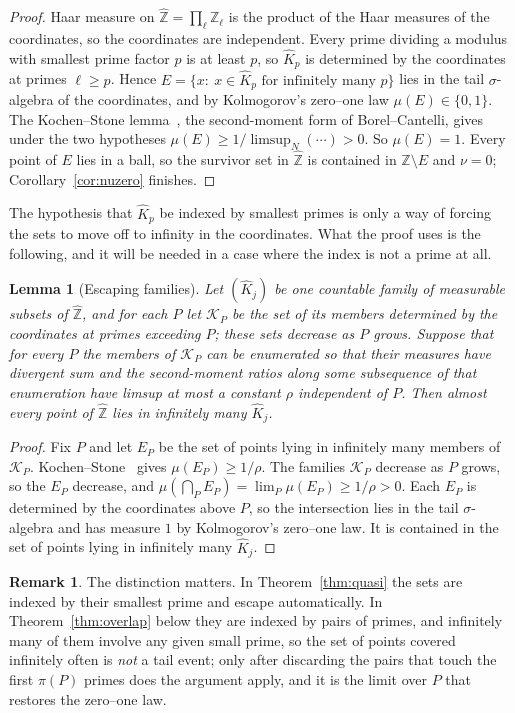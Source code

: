 \documentclass[11pt]{article}
\theoremstyle{plain}
\newtheorem{lemma}[theorem]{Lemma}
\theoremstyle{definition}
\newtheorem{remark}[theorem]{Remark}
\newcommand{\Zhat}{\widehat{\mathbb{Z}}}
\newcommand{\Kh}{\widehat{K}}
\begin{document}
\begin{proof}
Haar measure on $\Zhat=\prod_\ell\mathbb{Z}_\ell$ is the product
of the Haar measures of the coordinates, so the coordinates are
independent.  Every prime dividing a modulus with smallest prime
factor $p$ is at least $p$, so $\Kh_p$ is determined by the
coordinates at primes $\ell\ge p$.  Hence
$E=\{x:\ x\in \Kh_p\text{ for infinitely many }p\}$ lies in the
tail $\sigma$-algebra of the coordinates, and by Kolmogorov's
zero--one law $\mu(E)\in\{0,1\}$.  The Kochen--Stone
lemma~\cite{KS}, the second-moment form of Borel--Cantelli,
gives under the two hypotheses
$\mu(E)\ge1/\limsup_N(\cdots)>0$.  So $\mu(E)=1$.  Every point
of $E$ lies in a ball, so the survivor set in $\Zhat$ is
contained in $\Zhat\setminus E$ and $\nu=0$;
Corollary~\ref{cor:nuzero} finishes.
\end{proof}

The hypothesis that $\Kh_p$ be indexed by smallest primes is
only a way of forcing the sets to move off to infinity in the
coordinates.  What the proof uses is the following, and it will
be needed in a case where the index is not a prime at all.

\begin{lemma}[Escaping families]\label{lem:escape}
Let $(\Kh_j)$ be one countable family of measurable subsets of
$\Zhat$, and for each $P$ let $\mathcal{K}_P$ be the set of its
members determined by the coordinates at primes exceeding $P$;
these sets decrease as $P$ grows.  Suppose
that for every $P$ the members of $\mathcal{K}_P$ can be
enumerated so that their measures have divergent sum and the
second-moment ratios along some subsequence of that
enumeration have limsup at most a constant $\rho$ independent of
$P$.  Then almost every point of $\Zhat$
lies in infinitely many $\Kh_j$.
\end{lemma}

\begin{proof}
Fix $P$ and let $E_P$ be the set of points lying in infinitely
many members of $\mathcal{K}_P$.  Kochen--Stone~\cite{KS} gives
$\mu(E_P)\ge1/\rho$.  The families $\mathcal{K}_P$ decrease as
$P$ grows, so the $E_P$ decrease, and $\mu(\bigcap_PE_P)
=\lim_P\mu(E_P)\ge1/\rho>0$.  Each $E_P$ is determined by the
coordinates above $P$, so the intersection lies in the tail
$\sigma$-algebra and has measure $1$ by Kolmogorov's zero--one
law.  It is contained in the set of points lying in infinitely
many $\Kh_j$.
\end{proof}

\begin{remark}
The distinction matters.  In Theorem~\ref{thm:quasi} the sets
are indexed by their smallest prime and escape automatically.
In Theorem~\ref{thm:overlap} below they are indexed by pairs of
primes, and infinitely many of them involve any given small
prime, so the set of points covered infinitely often is
\emph{not} a tail event; only after discarding the pairs that
touch the first $\pi(P)$ primes does the argument apply, and it
is the limit over $P$ that restores the zero--one law.
\end{remark}
\end{document}

